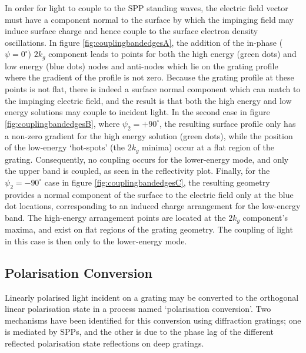 In order for light to couple to the SPP standing waves, the electric field vector must have a component normal to the surface by which the impinging field may induce surface charge and hence couple to the surface electron density oscillations. In figure \ref{fig:couplingbandedgesA}, the addition of the in-phase ($\psi=0^\circ$) $2k_g$ component leads to points for both the high energy (green dots) and low energy (blue dots) nodes and anti-nodes which lie on the grating profile where the gradient of the profile is not zero. Because the grating profile at these points is not flat, there is indeed a surface normal component which can match to the impinging electric field, and the result is that both the high energy and low energy solutions may couple to incident light. In the second case in figure \ref{fig:couplingbandedgesB}, where $\psi_2=+90^\circ$, the resulting surface profile only has a non-zero gradient for the high energy solution (green dots), while the position of the low-energy `hot-spots' (the $2k_g$ minima) occur at a flat region of the grating. Consequently, no coupling occurs for the lower-energy mode, and only the upper band is coupled, as seen in the reflectivity plot. Finally, for the $\psi_2=-90^\circ$ case in figure \ref{fig:couplingbandedgesC}, the resulting geometry provides a normal component of the surface to the electric field only at the blue dot locations, corresponding to an induced charge arrangement for the low-energy band. The high-energy arrangement points are located at the $2k_g$ component's maxima, and exist on flat regions of the grating geometry. The coupling of light in this case is then only to the lower-energy mode. 


\subsection{Polarisation Conversion}
Linearly polarised light incident on a grating may be converted to the orthogonal linear polarisation state in a process named `polarisation conversion'. Two mechanisms have been identified for this conversion using diffraction gratings; one is mediated by SPPs, and the other is due to the phase lag of the different reflected polarisation state reflections on deep gratings.

